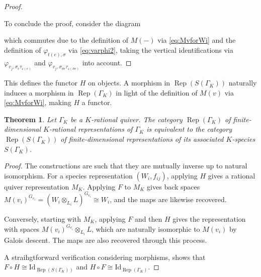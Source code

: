 \documentclass[a4paper,12pt,reqno]{amsart}
\DeclareMathOperator{\Rep}{\mathrm{Rep}}
\theoremstyle{plain}
\newtheorem{theorem}{Theorem}[section]
\theoremstyle{remark}
\begin{document}
\begin{proof}
\begin{center}
    \end{center}
    To conclude the proof, consider the diagram
    \begin{center}
    \end{center}
    which commutes due to the definition of $M(-)$ via \eqref{eq:MvforWi} and the definition of $\varphi_{t(e),\sigma}$ via \eqref{eq:varphi2}, taking the vertical identifications via $\varphi_{v_j,\sigma_e\tau_{\varepsilon(e)}}$ and $\varphi_{v_j,\sigma_{\sigma e}\tau_{\varepsilon(\sigma e)}}$ into account.
  \end{proof}
  This defines the functor $H$ on objects. A morphism in $\Rep(S(\Gamma_K))$ naturally induces a morphism in $\Rep(\Gamma_K)$ in light of the definition of $M(v)$ via \eqref{eq:MvforWi}, making $H$ a functor.

  \begin{theorem}\label{thm:species_equivalence}
  Let $\Gamma_K$ be a $K$-rational quiver. The category $\Rep(\Gamma_K)$ of finite-dimensional $K$-rational representations of $\Gamma_K$ is equivalent to the category $\Rep(S(\Gamma_K))$ of finite-dimensional representations of its associated $K$-species $S(\Gamma_K)$.
  \end{theorem}

  \begin{proof}
  The constructions are such that they are mutually inverse up to natural isomorphism. For a species representation $(W_i, f_{ij})$, applying $H$ gives a rational quiver representation $M_K$. Applying $F$ to $M_K$ gives back spaces $M(v_i)^{G_{v_i}} = (W_i\otimes_{L_i}L)^{G_{v_i}} \cong W_i$, and the maps are likewise recovered.
  
  Conversely, starting with $M_K$, applying $F$ and then $H$ gives the representation with spaces $M(v_i)^{G_{v_i}}\otimes_{L_i}L$, which are naturally isomorphic to $M(v_i)$ by Galois descent. The maps are also recovered through this process.

  A straihgtforward verification considering morphisms, shows that $F \circ H \cong \mathrm{Id}_{\Rep(S(\Gamma_K))}$ and $H \circ F \cong \mathrm{Id}_{\Rep(\Gamma_K)}$.
  \end{proof}
\end{document}
